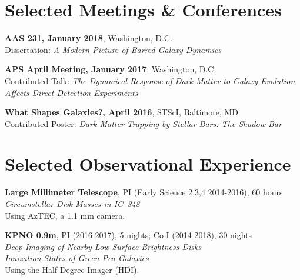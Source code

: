 \documentclass[margin, 12pt]{res} %
\begin{document}
\begin{resume}
\pagebreak

\section{\sc Selected Meetings \& Conferences}
{\bf AAS 231, January 2018}, Washington, D.C.\\
Dissertation: {\it A Modern Picture of Barred Galaxy Dynamics}

{\bf APS April Meeting, January 2017}, Washington, D.C.\\
Contributed Talk: {\it The Dynamical Response of Dark Matter to Galaxy Evolution Affects Direct-Detection Experiments}


{\bf What Shapes Galaxies?, April 2016}, STScI, Baltimore, MD\\
Contributed Poster: {\it Dark Matter Trapping by Stellar Bars: The Shadow Bar}


\section{\sc Selected Observational Experience}

{\bf Large Millimeter Telescope}, PI (Early Science 2,3,4 2014-2016), 60 hours\\
{\it Circumstellar Disk Masses in IC~348}\\
Using AzTEC, a 1.1 mm camera.

{\bf KPNO 0.9m}, PI (2016-2017), 5 nights; Co-I (2014-2018), 30 nights\\
{\it Deep Imaging of Nearby Low Surface Brightness Disks}\\
{\it Ionization States of Green Pea Galaxies}\\
Using the Half-Degree Imager (HDI).



\end{resume}
\end{document}
